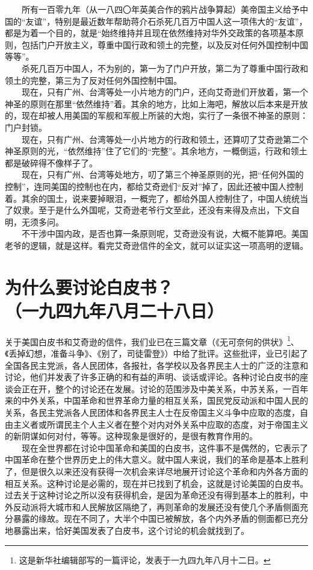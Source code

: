 \documentclass[cn,11pt,chinese]{elegantbook}
\def\myformat#1{\hfil\hfil #1}
\begin{document}
　　所有一百零九年（从一八四〇年英美合作的鸦片战争算起）美帝国主义给予中国的“友谊”，特别是最近数年帮助蒋介石杀死几百万中国人这一项伟大的“友谊”，都是为着一个目的，就是“始终维持并且现在依然维持对华外交政策的各项基本原则，包括门户开放主义，尊重中国行政和领土的完整，以及反对任何外国控制中国等等”。\\
　　杀死几百万中国人，不为别的，第一为了门户开放，第二为了尊重中国行政和领土的完整，第三为了反对任何外国控制中国。\\
　　现在，只有广州、台湾等处一小片地方的门户，还向艾奇逊们开放着，第一个神圣的原则在那里“依然维持”着。其余的地方，比如上海吧，解放以后本来是开放的，现在却被人用美国的军舰和军舰上所装的大炮，实行了一条很不神圣的原则：门户封锁。\\
　　现在，只有广州、台湾等处一小片地方的行政和领土，还算叨了艾奇逊第二个神圣原则的光，“依然维持”住了它们的“完整”。其余地方，一概倒运，行政和领土都是破碎得不像样子了。\\
　　现在，只有广州、台湾等处地方，叨了第三个神圣原则的光，把“任何外国的控制”，连同美国的控制也在内，都给艾奇逊们“反对”掉了，因此还被中国人控制着。其余的国土，说来要掉眼泪，一概完了，都给外国人控制住了，中国人统统当了奴隶。至于是什么外国呢，艾奇逊老爷行文至此，还没有来得及点出，下文自明，无须多问。\\
　　不干涉中国内政，是否也算一条原则呢，艾奇逊没有说，大概不能算吧。美国老爷的逻辑，就是这样。看完艾奇逊信件的全文，就可以证实这一项高明的逻辑。\\
\newpage\section*{\myformat{为什么要讨论白皮书？}\\\myformat{（一九四九年八月二十八日）}}
关于美国白皮书和艾奇逊的信件，我们业已在三篇文章（《无可奈何的供状》\footnote[1]{ 这是新华社编辑部写的一篇评论，发表于一九四九年八月十二日。}、《丢掉幻想，准备斗争》、《别了，司徒雷登》）中给了批评。这些批评，业已引起了全国各民主党派，各人民团体，各报社，各学校以及各界民主人士的广泛的注意和讨论，他们并发表了许多正确的和有益的声明、谈话或评论。各种讨论白皮书的座谈会正在开，整个的讨论还在发展。讨论的范围涉及中美关系，中苏关系，一百年来的中外关系，中国革命和世界革命力量的相互关系，国民党反动派和中国人民的关系，各民主党派各人民团体和各界民主人士在反帝国主义斗争中应取的态度，自由主义者或所谓民主个人主义者在整个对内对外关系中应取的态度，对于帝国主义的新阴谋如何对付，等等。这种现象是很好的，是很有教育作用的。\\
　　现在全世界都在讨论中国革命和美国的白皮书，这件事不是偶然的，它表示了中国革命在整个世界历史上的伟大意义。就中国人来说，我们的革命是基本上胜利了，但是很久以来还没有获得一次机会来详尽地展开讨论这个革命和内外各方面的相互关系。这种讨论是必需的，现在并已找到了机会，这就是讨论美国的白皮书。过去关于这种讨论之所以没有获得机会，是因为革命还没有得到基本上的胜利，中外反动派将大城市和人民解放区隔绝了，再则革命的发展还没有使几个矛盾侧面充分暴露的缘故。现在不同了，大半个中国已被解放，各个内外矛盾的侧面都已充分地暴露出来，恰好美国发表了白皮书，这个讨论的机会就找到了。\\
\end{document}
